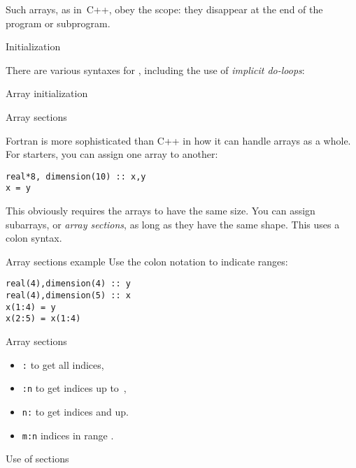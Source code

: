 Such arrays, as in~C++, obey the scope: they disappear at the end of
the program or subprogram.

 {Initialization}

There are various syntaxes for ,
including the use of
\emph{implicit do-loops}:
%
\begin{block}{Array initialization}
  \label{sl:farray-init}
\end{block}

 {Array sections}

Fortran is more sophisticated than C++ in how it can handle arrays as
a whole. For starters, you can assign one array to another:

\begin{verbatim}
real*8, dimension(10) :: x,y
x = y
\end{verbatim}

This obviously requires the arrays to have the same size.
You can assign subarrays, or \emph{array sections},
as long as they have the same shape. This uses a colon syntax.

\begin{slide}{Array sections example}
  \label{sl:farray-section}
  Use the colon notation to indicate ranges:
\begin{verbatim}
real(4),dimension(4) :: y
real(4),dimension(5) :: x
x(1:4) = y
x(2:5) = x(1:4)
\end{verbatim}
\end{slide}

\begin{block}{Array sections}
  \label{sl:farray-sections}
  \begin{itemize}
  \item {\tt :} %
    to get all indices,
  \item {\tt :n} %
    to get indices up to~,
  \item {\tt n:} %
    to get indices  and up.
  \item {\tt m:n}
    indices in range .
  \end{itemize}
\end{block}

\begin{block}{Use of sections}
  \label{sl:farray-sectionassign}
\end{block}

